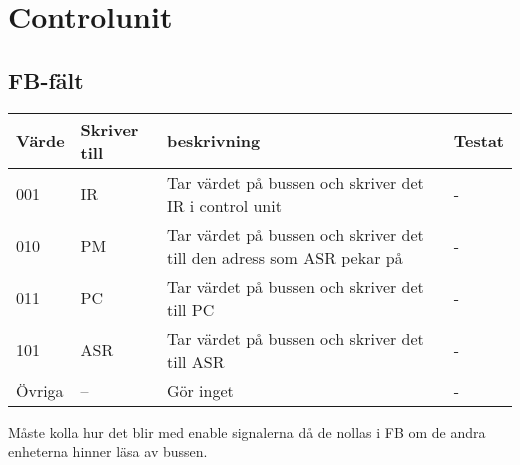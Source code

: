 \documentclass[titlepage, a4paper]{article}
\begin{document}
\LIPSTitelsida

\begin{LIPSprojektidentitet}
\end{LIPSprojektidentitet}


\newpage

\begin{LIPSdokumenthistorik}
\end{LIPSdokumenthistorik}

\newpage
{}	%
\section{Controlunit}
\subsection{FB-fält}
\begin{table}[H]
  \centering
  \begin{tabular}{|l|l|l|l|}
    \hline
    \textbf{Värde} & \textbf{Skriver till} & \textbf{beskrivning} & \textbf{Testat} \\ \hline
     001 & IR & Tar värdet på bussen och skriver det IR i control unit &- \\ \hline
  010 & PM & Tar värdet på bussen och skriver det till den adress som ASR pekar på &- \\ \hline
   011 & PC & Tar värdet på bussen och skriver det till PC &- \\ \hline
     101 & ASR & Tar värdet på bussen och skriver det till ASR &- \\ \hline
      Övriga & -- & Gör inget &- \\ \hline
  \end{tabular}
\end{table}
Måste kolla hur det blir med enable signalerna då de nollas i FB om de andra enheterna hinner läsa av bussen.
\end{document}
